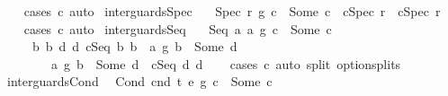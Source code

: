 \begin{isabellebody}
%
\isadelimproof
\ \ %
\endisadelimproof
%
\isatagproof
{}\isamarkupfalse%
\ {\isacharparenleft}cases\ c{}{\isacharparenright}\ auto%
\endisatagproof
{\isafoldproof}%
%
\isadelimproof
\isanewline
%
\endisadelimproof
\isanewline
{}\isamarkupfalse%
\ inter{\isacharunderscore}guards{\isacharunderscore}Spec{\isacharcolon}\ \isanewline
\ \ {\isachardoublequoteopen}{\isacharparenleft}{\isacharparenleft}Spec\ r{\isacharparenright}\ {\isasyminter}\isactrlsub g\ c{}{\isacharparenright}\ {\isacharequal}\ Some\ c\ {\isacharequal}\ {\isacharparenleft}c{}{\isacharequal}Spec\ r\ {\isasymand}\ c{\isacharequal}Spec\ r{\isacharparenright}{\isachardoublequoteclose}\isanewline
%
\isadelimproof
\ \ %
\endisadelimproof
%
\isatagproof
{}\isamarkupfalse%
\ {\isacharparenleft}cases\ c{}{\isacharparenright}\ auto%
\endisatagproof
{\isafoldproof}%
%
\isadelimproof
\isanewline
%
\endisadelimproof
\isanewline
{}\isamarkupfalse%
\ inter{\isacharunderscore}guards{\isacharunderscore}Seq{\isacharcolon}\ \isanewline
\ \ {\isachardoublequoteopen}{\isacharparenleft}Seq\ a{}\ a{}\ {\isasyminter}\isactrlsub g\ c{}{\isacharparenright}\ {\isacharequal}\ Some\ c\ {\isacharequal}\ \isanewline
\ \ \ \ \ {\isacharparenleft}{\isasymexists}b{}\ b{}\ d{}\ d{}{\isachardot}\ c{}{\isacharequal}Seq\ b{}\ b{}\ {\isasymand}\ {\isacharparenleft}a{}\ {\isasyminter}\isactrlsub g\ b{}{\isacharparenright}\ {\isacharequal}\ Some\ d{}\ {\isasymand}\ \isanewline
\ \ \ \ \ \ \ \ {\isacharparenleft}a{}\ {\isasyminter}\isactrlsub g\ b{}{\isacharparenright}\ {\isacharequal}\ Some\ d{}\ {\isasymand}\ c{\isacharequal}Seq\ d{}\ d{}{\isacharparenright}{\isachardoublequoteclose}\isanewline
%
\isadelimproof
\ \ %
\endisadelimproof
%
\isatagproof
{}\isamarkupfalse%
\ {\isacharparenleft}cases\ c{}{\isacharparenright}\ {\isacharparenleft}auto\ split{\isacharcolon}\ option{\isachardot}splits{\isacharparenright}%
\endisatagproof
{\isafoldproof}%
%
\isadelimproof
\isanewline
%
\endisadelimproof
\isanewline
{}\isamarkupfalse%
\ inter{\isacharunderscore}guards{\isacharunderscore}Cond{\isacharcolon}\isanewline
\ \ {\isachardoublequoteopen}{\isacharparenleft}Cond\ cnd\ t{}\ e{}\ {\isasyminter}\isactrlsub g\ c{}{\isacharparenright}\ {\isacharequal}\ Some\ c\ {\isacharequal}\isanewline

\end{isabellebody}
